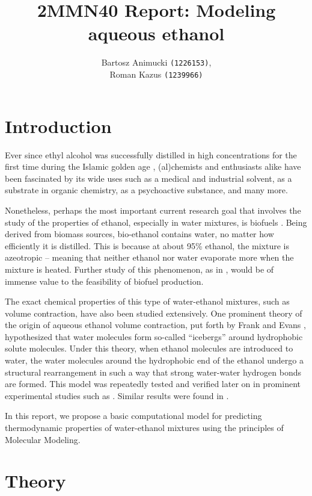 \documentclass[11pt,a4paper]{article}
\author{Bartosz Animucki {\tt (1226153)}, \\ Roman Kazus {\tt (1239966)}}
\title{2MMN40 Report: Modeling aqueous ethanol}
\begin{document}
	\maketitle
	
	\section{Introduction}
	Ever since ethyl alcohol was successfully distilled in high concentrations for the first time during the Islamic golden age \cite{first_distil}, (al)chemists and enthusiasts alike have been fascinated by its wide uses such as a medical and industrial solvent, as a substrate in organic chemistry, as a psychoactive substance, and many more. 
	
	Nonetheless, perhaps the most important current research goal that involves the study of the properties of ethanol, especially in water mixtures, is biofuels \cite{quovadis} \cite{fuelcell}. Being derived from biomass sources, bio-ethanol contains water, no matter how efficiently it is distilled. This is because at about 95\% ethanol, the mixture is azeotropic -- meaning that neither ethanol nor water evaporate more when the mixture is heated. Further study of this phenomenon, as in \cite{azeobreak}, would be of immense value to the feasibility of biofuel production. 
	
	The exact chemical properties of this type of water-ethanol mixtures, such as volume contraction, have also been studied extensively. One prominent theory of the origin of aqueous ethanol volume contraction, put forth by Frank and Evans \cite{frankevans}, hypothesized that water molecules form so-called ``icebergs'' around hydrophobic solute molecules. Under this theory, when ethanol molecules are introduced to water, the water molecules around the hydrophobic  end  of  the  ethanol  undergo  a  structural rearrangement in such a way that strong water-water hydrogen bonds are formed. This model was repeatedly tested and verified later on in prominent experimental studies such as \cite{parke}. Similar results were found in \cite{guoetal}.
	
	In this report, we propose a basic computational model for predicting thermodynamic properties of water-ethanol mixtures using the principles of Molecular Modeling.
	
	\section{Theory}
	
\end{document}
